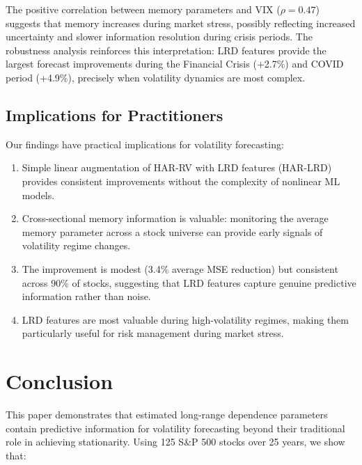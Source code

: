 \documentclass[12pt,a4paper]{article}
\begin{document}
The positive correlation between memory parameters and VIX ($\rho = 0.47$) suggests that memory increases during market stress, possibly reflecting increased uncertainty and slower information resolution during crisis periods. The robustness analysis reinforces this interpretation: LRD features provide the largest forecast improvements during the Financial Crisis (+2.7\%) and COVID period (+4.9\%), precisely when volatility dynamics are most complex.

\subsection{Implications for Practitioners}

Our findings have practical implications for volatility forecasting:
\begin{enumerate}
    \item Simple linear augmentation of HAR-RV with LRD features (HAR-LRD) provides consistent improvements without the complexity of nonlinear ML models.
    \item Cross-sectional memory information is valuable: monitoring the average memory parameter across a stock universe can provide early signals of volatility regime changes.
    \item The improvement is modest (3.4\% average MSE reduction) but consistent across 90\% of stocks, suggesting that LRD features capture genuine predictive information rather than noise.
    \item LRD features are most valuable during high-volatility regimes, making them particularly useful for risk management during market stress.
\end{enumerate}

\section{Conclusion}
\label{sec:conclusion}

This paper demonstrates that estimated long-range dependence parameters contain predictive information for volatility forecasting beyond their traditional role in achieving stationarity. Using 125 S\&P 500 stocks over 25 years, we show that:
\end{document}
